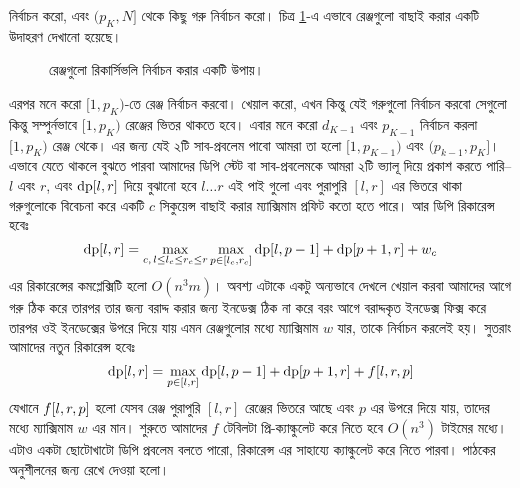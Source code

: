 \begin{solution}
  নির্বাচন করো, এবং $(p_K, N]$ থেকে কিছু গরু নির্বাচন করো। চিত্র
  \ref{greedy_pie_eaters:1}-এ এভাবে রেঞ্জগুলো বাছাই করার একটি উদাহরণ দেখানো
  হয়েছে।
  \begin{figure}
    \centering
    
    \caption{রেঞ্জগুলো রিকার্সিভলি নির্বাচন করার একটি উপায়।}
    \label{greedy_pie_eaters:1}
  \end{figure}
  এরপর মনে করো $[1, p_K)$-তে রেঞ্জ নির্বাচন করবো। খেয়াল করো, এখন কিন্তু যেই
  গরুগুলো নির্বাচন করবো সেগুলো কিন্তু সম্পুর্নভাবে $[1, p_K)$ রেঞ্জের ভিতর
  থাকতে হবে। এবার মনে করো $d_{K-1}$ এবং $p_{K-1}$ নির্বাচন করলা $[1, p_K)$
  রেঞ্জ থেকে। এর জন্য যেই ২টি সাব-প্রবলেম পাবো আমরা তা হলো $[1, p_{K-1})$ এবং
  $(p_{k-1}, p_{K}]$। এভাবে যেতে থাকলে বুঝতে পারবা আমাদের ডিপি স্টেট বা
  সাব-প্রবলেমকে আমরা ২টি ভ্যালূ দিয়ে প্রকাশ করতে পারি-- $l$ এবং $r$, এবং
  $\text{dp}[l, r]$ দিয়ে বুঝানো হবে $l \ldots r$ এই পাই গুলো এবং পুরাপুরি $[l,
  r]$ এর ভিতরে থাকা গরুগুলোকে বিবেচনা করে একটি $c$ সিকুয়েন্স বাছাই করার
  ম্যাক্সিমাম প্রফিট কতো হতে পারে। আর ডিপি রিকারেন্স হবেঃ
  \[
    \text{dp}[l, r] = \max_{c,\, l \le l_c \le r_c \le r} \max_{p \in [l_c,
    r_c]} \text{dp}[l, p-1] + \text{dp}[p+1, r] + w_c
  \]
  এর রিকারেন্সের কমপ্লেক্সিটি হলো $O(n^3m)$। অবশ্য এটাকে একটু অন্যভাবে দেখলে
  খেয়াল করবা আমাদের আগে গরু ঠিক করে তারপর তার জন্য বরাদ্দ করার জন্য ইনডেক্স
  ঠিক না করে বরং আগে বরাদ্দকৃত ইনডেক্স ফিক্স করে তারপর ওই ইনডেক্সের উপরে দিয়ে
  যায় এমন রেঞ্জগুলোর মধ্যে ম্যাক্সিমাম $w$ যার, তাকে নির্বাচন করলেই হয়।
  সুতরাং আমাদের নতুন রিকারেন্স হবেঃ
  \[
    \text{dp}[l, r] = \max_{p \in [l, r]} \text{dp}[l, p-1] + \text{dp}[p+1, r] +
    f[l, r, p]
  \]
  যেখানে $f[l, r, p]$ হলো যেসব রেঞ্জ পুরাপুরি $[l, r]$ রেঞ্জের ভিতরে
  আছে এবং $p$ এর উপরে দিয়ে যায়, তাদের মধ্যে ম্যাক্সিমাম $w$ এর মান। শুরুতে
  আমাদের $f$ টেবিলটা প্রি-ক্যাল্কুলেট করে নিতে হবে $O(n^3)$ টাইমের মধ্যে।
  এটাও একটা ছোটোখাটো ডিপি প্রবলেম বলতে পারো, রিকারেন্স এর সাহায্যে
  ক্যাল্কুলেট করে নিতে পারবা। পাঠকের অনুশীলনের জন্য রেখে দেওয়া হলো।
\end{solution}

